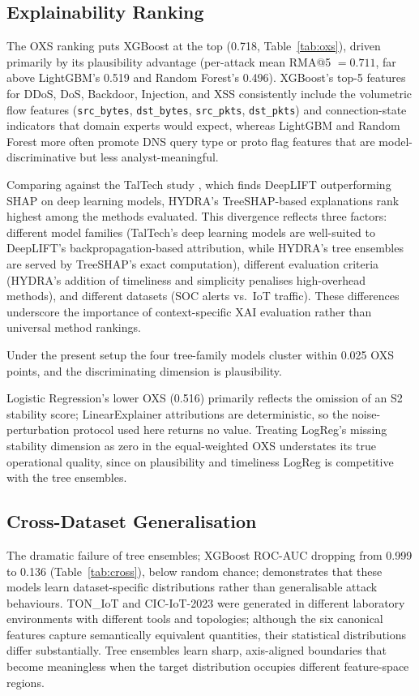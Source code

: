 \documentclass[12pt,a4paper]{report}
\begin{document}
\subsection{Explainability Ranking}
\label{sec:disc-xai}

The OXS ranking puts XGBoost at the top (0.718, Table~\ref{tab:oxs}), driven primarily by its plausibility advantage (per-attack mean RMA@5 $= 0.711$, far above LightGBM's 0.519 and Random Forest's 0.496). XGBoost's top-5 features for DDoS, DoS, Backdoor, Injection, and XSS consistently include the volumetric flow features (\texttt{src\_bytes}, \texttt{dst\_bytes}, \texttt{src\_pkts}, \texttt{dst\_pkts}) and connection-state indicators that domain experts would expect, whereas LightGBM and Random Forest more often promote DNS query type or proto flag features that are model-discriminative but less analyst-meaningful.

Comparing against the TalTech study \cite{kalakoti2025}, which finds DeepLIFT outperforming SHAP on deep learning models, HYDRA's TreeSHAP-based explanations rank highest among the methods evaluated. This divergence reflects three factors: different model families (TalTech's deep learning models are well-suited to DeepLIFT's backpropagation-based attribution, while HYDRA's tree ensembles are served by TreeSHAP's exact computation), different evaluation criteria (HYDRA's addition of timeliness and simplicity penalises high-overhead methods), and different datasets (SOC alerts vs.\ IoT traffic). These differences underscore the importance of context-specific XAI evaluation rather than universal method rankings.

Under the present setup the four tree-family models cluster within 0.025 OXS points, and the discriminating dimension is plausibility.

Logistic Regression's lower OXS (0.516) primarily reflects the omission of an S2 stability score; LinearExplainer attributions are deterministic, so the noise-perturbation protocol used here returns no value. Treating LogReg's missing stability dimension as zero in the equal-weighted OXS understates its true operational quality, since on plausibility and timeliness LogReg is competitive with the tree ensembles.

\subsection{Cross-Dataset Generalisation}
\label{sec:disc-cross}

The dramatic failure of tree ensembles; XGBoost ROC-AUC dropping from 0.999 to 0.136 (Table~\ref{tab:cross}), below random chance; demonstrates that these models learn dataset-specific distributions rather than generalisable attack behaviours. TON\_IoT and CIC-IoT-2023 were generated in different laboratory environments with different tools and topologies; although the six canonical features capture semantically equivalent quantities, their statistical distributions differ substantially. Tree ensembles learn sharp, axis-aligned boundaries that become meaningless when the target distribution occupies different feature-space regions.
\end{document}
